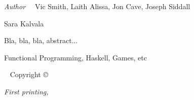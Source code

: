 

\frontmatter

%


\maketitle


\newpage
\begin{fullwidth}
	{\large {\it Author\ \ } Vic Smith, Laith Alissa, Jon Cave, Joseph Siddall
	
	\vspace{1em} Sara Kalvala
	
	\vspace{1em} Bla, bla, bla, abstract...
	
	\vspace{1em} Functional Programming, Haskell, Games, etc
	
	}
	
	~\vfill
	\thispagestyle{empty}
	\setlength{\parindent}{0pt}
	\setlength{\parskip}{\baselineskip}
	Copyright \copyright\ \the\year\ \thanklessauthor
	
	\par{}
	
	
	\par\textit{First printing, \monthyear}

	\newpage

\tableofcontents

\end{fullwidth}

